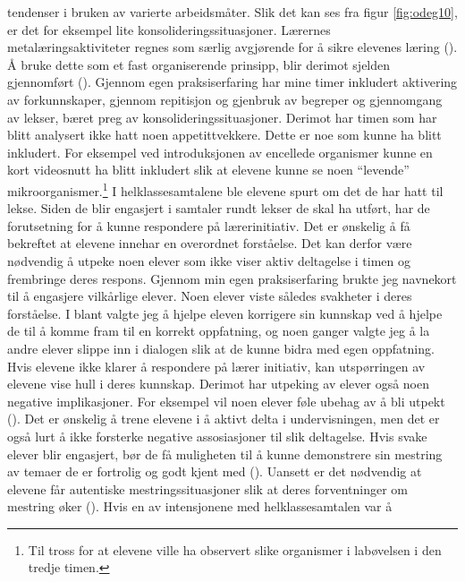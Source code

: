 \documentclass[main.tex]{subfiles}
\begin{document}
tendenser i bruken av varierte arbeidsmåter. Slik det kan ses fra figur \ref{fig:odeg10}, er det for 
eksempel lite konsolideringssituasjoner. Lærernes metalæringsaktiviteter regnes som særlig 
avgjørende for å sikre elevenes læring (). Å bruke dette som et fast
organiserende prinsipp, blir derimot sjelden gjennomført (). Gjennom egen 
praksiserfaring har mine timer inkludert aktivering av forkunnskaper, gjennom repitisjon og 
gjenbruk av begreper og gjennomgang av lekser, bæret preg av konsolideringssituasjoner. Derimot
har timen som har blitt analysert ikke hatt noen appetittvekkere. Dette er noe som kunne ha blitt 
inkludert. For eksempel ved introduksjonen av encellede organismer kunne en kort videosnutt ha blitt
inkludert slik at elevene kunne se noen ``levende'' mikroorganismer.\footnote[3]{Til tross for at 
elevene ville ha observert slike organismer i labøvelsen i den tredje timen.}  
\newline
\newline
I helklassesamtalene ble elevene spurt om det de har hatt til lekse.
Siden de blir engasjert i samtaler rundt lekser de skal ha utført, har de forutsetning for å kunne 
respondere på lærerinitiativ. Det er ønskelig å få bekreftet at elevene innehar en overordnet 
forståelse. Det kan derfor være nødvendig å utpeke noen elever som ikke viser aktiv deltagelse i 
timen og frembringe deres respons. Gjennom min egen praksiserfaring brukte jeg navnekort
til å engasjere vilkårlige elever. Noen elever viste således svakheter i deres forståelse.
I blant valgte jeg å hjelpe eleven korrigere sin kunnskap ved å hjelpe de til å komme
fram til en korrekt oppfatning, og noen ganger valgte jeg å la andre elever slippe inn i dialogen
slik at de kunne bidra med egen oppfatning.
\newline
\newline
Hvis elevene ikke klarer å respondere på lærer initiativ, kan utspørringen av elevene vise hull 
i deres kunnskap. Derimot har utpeking av elever også noen negative implikasjoner. For eksempel 
vil noen elever føle ubehag av å bli utpekt (). Det er ønskelig å trene 
elevene i å aktivt delta i undervisningen, men det er også lurt å ikke forsterke negative 
assosiasjoner til slik deltagelse. Hvis svake elever blir engasjert, bør de få muligheten til å 
kunne demonstrere sin mestring av temaer de er fortrolig og godt kjent med (). 
Uansett er det nødvendig at elevene får autentiske mestringssituasjoner slik at deres forventninger
om mestring øker (). Hvis en av intensjonene med helklassesamtalen var å 
\end{document}
